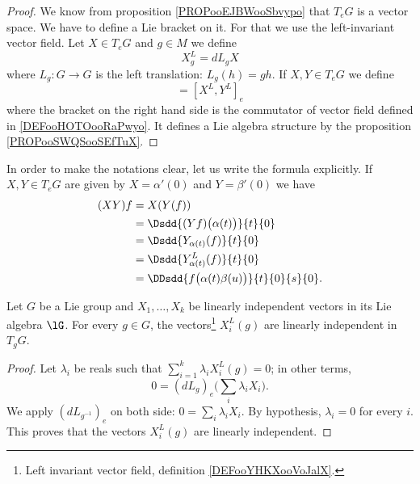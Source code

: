 \begin{proof}
	We know from proposition \ref{PROPooEJBWooSbvypo} that \( T_eG\) is a vector space. We have to define a Lie bracket on it. For that we use the left-invariant vector field. Let \( X\in T_eG\) and \( g\in M\) we define
	\begin{equation}
		X^L_g=dL_gX
	\end{equation}
	where \( L_g\colon G\to G\) is the left translation: \( L_g(h)=gh\). If \( X,Y\in T_eG\) we define
	\begin{equation}
		[X,Y]=[X^L,Y^L]_e
	\end{equation}
	where the bracket on the right hand side is the commutator of vector field defined in \ref{DEFooHOTOooRaPwyo}. It defines a Lie algebra structure by the proposition \ref{PROPooSWQSooSEfTuX}.
\end{proof}

In order to make the notations clear, let us write the formula explicitly. If \( X,Y\in T_eG\) are given by \( X=\alpha'(0)\) and \( Y=\beta'(0)\) we have
\begin{subequations}        \label{SUBEQSooHKWMooQbeStl}
	\begin{align}
		(XY)f & =X(Y(f))                                               \\
		      & =\Dsdd{ (Yf)\big( \alpha(t) \big) }{t}{0}              \\
		      & =\Dsdd{ Y_{\alpha(t)}(f) }{t}{0}                       \\
		      & =\Dsdd{ Y^L_{\alpha(t)}(f) }{t}{0}                     \\
		      & =\DDsdd{ f\big( \alpha(t)\beta(u) \big) }{t}{0}{s}{0}.
	\end{align}
\end{subequations}


\begin{lemma}       \label{LEMooWTNRooCjlYMJ}
	Let \( G\) be a Lie group and \( X_1,\ldots, X_k\) be linearly independent vectors in its Lie algebra \( \lG\). For every \( g\in G\), the vectors\footnote{Left invariant vector field, definition \ref{DEFooYHKXooVoJalX}.} \( X_i^L(g)\) are linearly independent in \( T_gG\).
\end{lemma}

\begin{proof}
	Let \( \lambda_i\) be reals such that \( \sum_{i=1}^k\lambda_iX_i^L(g)=0\); in other terms,
	\begin{equation}
		0=(dL_g)_e\big( \sum_i\lambda_iX_i \big).
	\end{equation}
	We apply \( (dL_{g^{-1}})_e\) on both side: \( 0=\sum_i\lambda_iX_i\). By hypothesis, \( \lambda_i=0\) for every \( i\). This proves that the vectors \( X^L_i(g)\) are linearly independent.
\end{proof}

